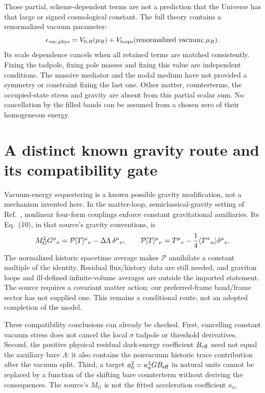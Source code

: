 \documentclass[11pt]{article}
\begin{document}
Those partial, scheme-dependent terms are not a prediction that the
Universe has that large or signed cosmological constant. The full theory
contains a renormalized vacuum parameter:
\begin{equation}
 \epsilon_{\rm vac,phys}=V_{0,R}(\mu_R)
               +V_{\rm loops}(\hbox{renormalized vacuum};\mu_R).
\end{equation}
Its scale dependence cancels when all retained terms are matched
consistently. Fixing the tadpole, fixing pole masses and fixing this value
are independent conditions. The massive mediator and the nodal medium
have not provided a symmetry or constraint fixing the last one.
Other matter, counterterms, the occupied-state stress and gravity are
absent from this partial scalar sum. No cancellation by the filled bands
can be assumed from a chosen zero of their homogeneous energy.

\section{A distinct known gravity route and its compatibility gate}
Vacuum-energy sequestering is a known possible gravity modification,
not a mechanism invented here. In the matter-loop, semiclassical-gravity
setting of Ref.~\cite{rv:sequester}, nonlinear four-form couplings enforce
constant gravitational auxiliaries. Its Eq.~(10), in that source's gravity
conventions, is
\begin{equation}
 M_G^2G^\mu{}_{\nu}
 =\mathcal P[T]^\mu{}_{\nu}-\Delta\Lambda\,\delta^\mu{}_{\nu},
 \qquad
 \mathcal P[T]^\mu{}_{\nu}
 =T^\mu{}_{\nu}-{1\over4}\langle T^\alpha{}_{\alpha}\rangle
                                      \delta^\mu{}_{\nu}.
\end{equation}
The normalized historic spacetime average makes $\mathcal P$ annihilate
a constant multiple of the identity. Residual flux/history data are still
needed, and graviton loops and ill-defined infinite-volume averages are
outside the imported statement. The source requires a covariant matter
action; our preferred-frame band/frame sector has not supplied one.
This remains a conditional route, not an adopted completion of the model.

Three compatibility conclusions can already be checked. First, cancelling
constant vacuum stress does not cancel the local $\sigma$ tadpole or
threshold derivatives. Second, the positive physical residual dark-energy
coefficient $B_{\rm eff}$ need not equal the auxiliary bare $\Lambda$:
it also contains the nonvacuum historic trace contribution after the
vacuum split. Third, a target $a_0^2=\kappa_a^2G B_{\rm eff}$ in natural
units cannot be replaced by a function of the shifting bare counterterm
without deriving the consequences. The source's $M_G$ is not the fitted
acceleration coefficient $\kappa_a$.
\end{document}
